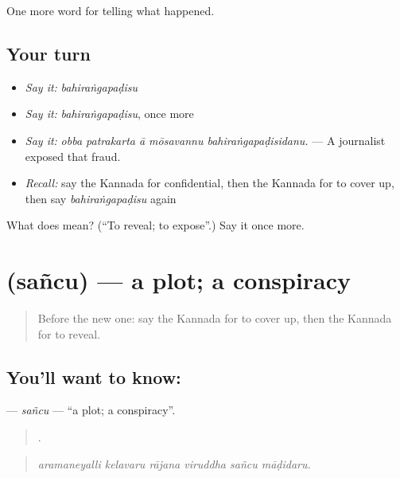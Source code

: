 \begin{grammarlens}[title={What you've built}]
One more word for telling what happened.
\end{grammarlens}

\subsection*{Your turn}
\begin{itemize}
\raggedright
  \item \emph{Say it:} \emph{bahiraṅgapaḍisu}
  \item \emph{Say it:} \emph{bahiraṅgapaḍisu}, once more
  \item \emph{Say it:} \emph{obba patrakarta ā mōsavannu bahiraṅgapaḍisidanu.} — A journalist exposed that fraud.
  \item \emph{Recall:} say the Kannada for confidential, then the Kannada for to cover up, then say \emph{bahiraṅgapaḍisu} again
\end{itemize}

\begin{tcolorbox}[breakable,colback=teal!4,colframe=teal!35!black,title={Before you move on}]
What does  mean? (\textquotedblleft{}To reveal; to expose\textquotedblright{}.) Say it once more.
\end{tcolorbox}
\section[\texorpdfstring{\kn{ಸಂಚು} (sañcu)}{ಸಂಚು (sañcu)}]{ (sañcu) — a plot; a conspiracy}

\label{lesson:KA-C357-sancu}



\begin{quote}
Before the new one: say the Kannada for to cover up, then the Kannada for to reveal.
\end{quote}

\subsection*{You'll want to know: }
\textbf{} — \emph{sañcu} — \textquotedblleft{}a plot; a conspiracy\textquotedblright{}.

\begin{quote}
     .
\end{quote}

\begin{quote}
\emph{aramaneyalli kelavaru rājana viruddha sañcu māḍidaru.}
\end{quote}


